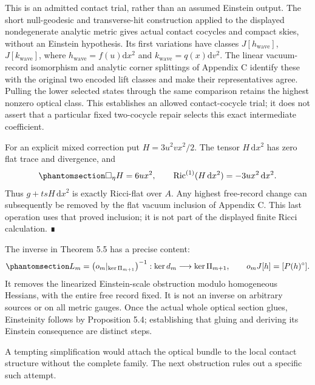 \documentclass[
  english,
  11pt,
  reqno]{amsart}
\begin{document}
This is an admitted contact trial, rather than an assumed Einstein
output. The short null-geodesic and transverse-hit construction applied
to the displayed nondegenerate analytic metric gives actual contact
cocycles and compact skies, without an Einstein hypothesis. Its first
variations have classes \(J[h_{\mathrm{wave}}]\),
\(J[k_{\mathrm{wave}}]\), where \(h_{\mathrm{wave}}=f(u)\mathrm dx^2\)
and \(k_{\mathrm{wave}}=q(x)\mathrm dv^2\). The linear vacuum-record
isomorphism and analytic corner splittings of Appendix C identify these
with the original two encoded lift classes and make their
representatives agree. Pulling the lower selected states through the
same comparison retains the highest nonzero optical class. This
establishes an allowed contact-cocycle trial; it does not assert that a
particular fixed two-cocycle repair selects this exact intermediate
coefficient.

For an explicit mixed correction put \(H=3u^2vx^2/2\). The tensor
\(H\,\mathrm dx^2\) has zero flat trace and divergence, and
\begin{equation}\protect\phantomsection\label{eq:gg-mixed-explicit-repair}{
 \Box_\eta H=6ux^2,\qquad
 \operatorname{Ric}^{(1)}(H\,\mathrm dx^2)
                           =-3ux^2\,\mathrm dx^2 .
}\end{equation} Thus \(g+tsH\,\mathrm dx^2\) is exactly Ricci-flat over
\(A\). Any highest free-record change can subsequently be removed by the
flat vacuum inclusion of Appendix C. This last operation uses that
proved inclusion; it is not part of the displayed finite Ricci
calculation. ∎

The inverse in Theorem 5.5 has a precise content:
\begin{equation}\protect\phantomsection\label{eq:gg-meaning-of-inverse}{
 L_m=\left(o_m|_{\ker\Pi_{m+1}}\right)^{-1}
       :\ker d_m\longrightarrow\ker\Pi_{m+1},\qquad
 o_mJ[h]=[P(h)^\circ].
}\end{equation} It removes the linearized Einstein-scale obstruction
modulo homogeneous Hessians, with the entire free record fixed. It is
not an inverse on arbitrary sources or on all metric gauges. Once the
actual whole optical section glues, Einsteinity follows by Proposition
5.4; establishing that gluing and deriving its Einstein consequence are
distinct steps.

A tempting simplification would attach the optical bundle to the local
contact structure without the complete family. The next obstruction
rules out a specific such attempt.
\end{document}
